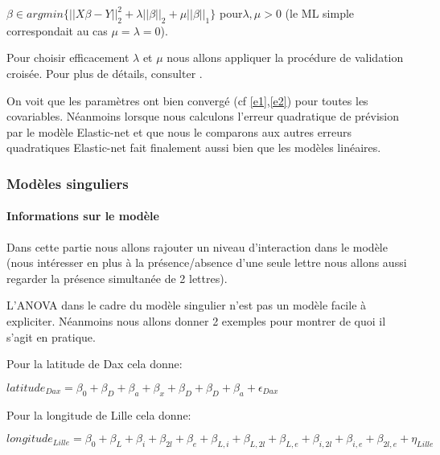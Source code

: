 \documentclass[french]{article}%
\begin{document}
			$\beta\in argmin\{||X\beta-Y||_{2}^{2}+\lambda||\beta||_{2}+\mu||\beta||_{1}\}$ pour$\lambda,\mu>0$ 
			(le ML simple correspondait au cas $\mu=\lambda=0$).
			
			Pour choisir efficacement $\lambda$ et $\mu$ nous allons appliquer la procédure de validation croisée. Pour plus de détails, consulter \cite{Cornillon2019}.
			
			On voit que les paramètres ont bien convergé (cf \autoref{e1},\autoref{e2}) pour toutes les covariables. Néanmoins lorsque nous calculons l'erreur quadratique de prévision par le modèle Elastic-net et que nous le comparons aux autres erreurs quadratiques Elastic-net fait finalement aussi bien que les modèles linéaires.	
		
	\subsubsection{Modèles singuliers}
	
		\paragraph*{Informations sur le modèle} 
		
			Dans cette partie nous allons rajouter un niveau d'interaction dans le modèle (nous intéresser en plus à la présence/absence d'une seule lettre nous allons aussi regarder la présence simultanée de 2 lettres).
			
%			
%			
			
			
			L'ANOVA dans le cadre du modèle singulier n'est pas un modèle facile à expliciter. Néanmoins nous allons donner 2 exemples pour montrer de quoi il s'agit en pratique.
			
			Pour la latitude de Dax cela donne:
			
			$latitude_{Dax}=\beta_{0}+\beta_{D}+\beta_{a}+\beta_{x}+\beta_{D}+\beta_{D}+\beta_{a}+\epsilon_{Dax}$
			
			Pour la longitude de Lille cela donne:
			
			$longitude_{Lille}=\beta_{0}+\beta_{L}+\beta_{i}+\beta_{2l}+\beta_{e}+\beta_{L,i}+\beta_{L,2l}+\beta_{L,e}+\beta_{i,2l}+\beta_{i,e}+\beta_{2l,e}+\eta_{Lille}$
			
\end{document}
